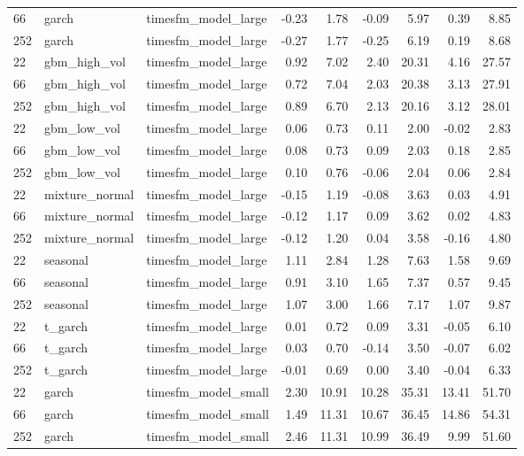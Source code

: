 {\begin{tabular}{lllrrrrrr}
66 & garch & timesfm\_model\_large & -0.23 & 1.78 & -0.09 & 5.97 & 0.39 & 8.85 \\
252 & garch & timesfm\_model\_large & -0.27 & 1.77 & -0.25 & 6.19 & 0.19 & 8.68 \\
\midrule
22 & gbm\_high\_vol & timesfm\_model\_large & 0.92 & 7.02 & 2.40 & 20.31 & 4.16 & 27.57 \\
66 & gbm\_high\_vol & timesfm\_model\_large & 0.72 & 7.04 & 2.03 & 20.38 & 3.13 & 27.91 \\
252 & gbm\_high\_vol & timesfm\_model\_large & 0.89 & 6.70 & 2.13 & 20.16 & 3.12 & 28.01 \\
\midrule
22 & gbm\_low\_vol & timesfm\_model\_large & 0.06 & 0.73 & 0.11 & 2.00 & -0.02 & 2.83 \\
66 & gbm\_low\_vol & timesfm\_model\_large & 0.08 & 0.73 & 0.09 & 2.03 & 0.18 & 2.85 \\
252 & gbm\_low\_vol & timesfm\_model\_large & 0.10 & 0.76 & -0.06 & 2.04 & 0.06 & 2.84 \\
\midrule
22 & mixture\_normal & timesfm\_model\_large & -0.15 & 1.19 & -0.08 & 3.63 & 0.03 & 4.91 \\
66 & mixture\_normal & timesfm\_model\_large & -0.12 & 1.17 & 0.09 & 3.62 & 0.02 & 4.83 \\
252 & mixture\_normal & timesfm\_model\_large & -0.12 & 1.20 & 0.04 & 3.58 & -0.16 & 4.80 \\
\midrule
22 & seasonal & timesfm\_model\_large & 1.11 & 2.84 & 1.28 & 7.63 & 1.58 & 9.69 \\
66 & seasonal & timesfm\_model\_large & 0.91 & 3.10 & 1.65 & 7.37 & 0.57 & 9.45 \\
252 & seasonal & timesfm\_model\_large & 1.07 & 3.00 & 1.66 & 7.17 & 1.07 & 9.87 \\
\midrule
22 & t\_garch & timesfm\_model\_large & 0.01 & 0.72 & 0.09 & 3.31 & -0.05 & 6.10 \\
66 & t\_garch & timesfm\_model\_large & 0.03 & 0.70 & -0.14 & 3.50 & -0.07 & 6.02 \\
252 & t\_garch & timesfm\_model\_large & -0.01 & 0.69 & 0.00 & 3.40 & -0.04 & 6.33 \\
\midrule
22 & garch & timesfm\_model\_small & 2.30 & 10.91 & 10.28 & 35.31 & 13.41 & 51.70 \\
66 & garch & timesfm\_model\_small & 1.49 & 11.31 & 10.67 & 36.45 & 14.86 & 54.31 \\
252 & garch & timesfm\_model\_small & 2.46 & 11.31 & 10.99 & 36.49 & 9.99 & 51.60 \\
\midrule

\end{tabular}}
